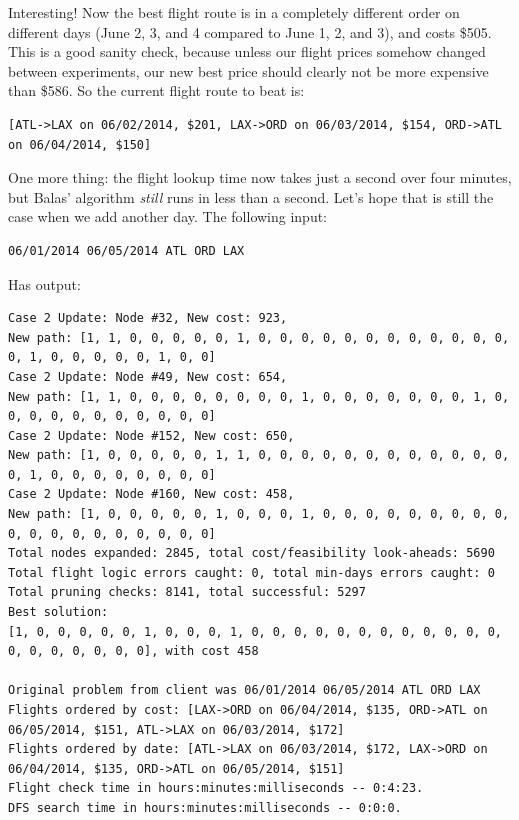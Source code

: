 \documentclass{article}
\begin{document}
Interesting! Now the best flight route is in a completely different order on different days (June 2, 3, and 4 compared to June 1, 2, and 3), and costs
\$505. This is a good sanity check, because unless our flight prices somehow changed between experiments, our new best price should clearly not be
more expensive than \$586. So the current flight route to beat is:

\footnotesize
\begin{verbatim}
[ATL->LAX on 06/02/2014, $201, LAX->ORD on 06/03/2014, $154, ORD->ATL on 06/04/2014, $150]
\end{verbatim}
\normalsize

One more thing: the flight lookup time now takes just a second over four minutes, but Balas' algorithm \emph{still} runs in less than a second. Let's
hope that is still the case when we add another day. The following input:

\begin{verbatim}
06/01/2014 06/05/2014 ATL ORD LAX
\end{verbatim}

Has output:

\scriptsize
\begin{verbatim}
Case 2 Update: Node #32, New cost: 923, 
New path: [1, 1, 0, 0, 0, 0, 0, 1, 0, 0, 0, 0, 0, 0, 0, 0, 0, 0, 0, 0, 0, 1, 0, 0, 0, 0, 0, 1, 0, 0]
Case 2 Update: Node #49, New cost: 654, 
New path: [1, 1, 0, 0, 0, 0, 0, 0, 0, 0, 1, 0, 0, 0, 0, 0, 0, 0, 1, 0, 0, 0, 0, 0, 0, 0, 0, 0, 0, 0]
Case 2 Update: Node #152, New cost: 650, 
New path: [1, 0, 0, 0, 0, 0, 1, 1, 0, 0, 0, 0, 0, 0, 0, 0, 0, 0, 0, 0, 0, 1, 0, 0, 0, 0, 0, 0, 0, 0]
Case 2 Update: Node #160, New cost: 458, 
New path: [1, 0, 0, 0, 0, 0, 1, 0, 0, 0, 1, 0, 0, 0, 0, 0, 0, 0, 0, 0, 0, 0, 0, 0, 0, 0, 0, 0, 0, 0]
Total nodes expanded: 2845, total cost/feasibility look-aheads: 5690
Total flight logic errors caught: 0, total min-days errors caught: 0
Total pruning checks: 8141, total successful: 5297
Best solution:
[1, 0, 0, 0, 0, 0, 1, 0, 0, 0, 1, 0, 0, 0, 0, 0, 0, 0, 0, 0, 0, 0, 0, 0, 0, 0, 0, 0, 0, 0], with cost 458

Original problem from client was 06/01/2014 06/05/2014 ATL ORD LAX
Flights ordered by cost: [LAX->ORD on 06/04/2014, $135, ORD->ATL on 06/05/2014, $151, ATL->LAX on 06/03/2014, $172]
Flights ordered by date: [ATL->LAX on 06/03/2014, $172, LAX->ORD on 06/04/2014, $135, ORD->ATL on 06/05/2014, $151]
Flight check time in hours:minutes:milliseconds -- 0:4:23.
DFS search time in hours:minutes:milliseconds -- 0:0:0.
\end{verbatim}
\normalsize
\end{document}

